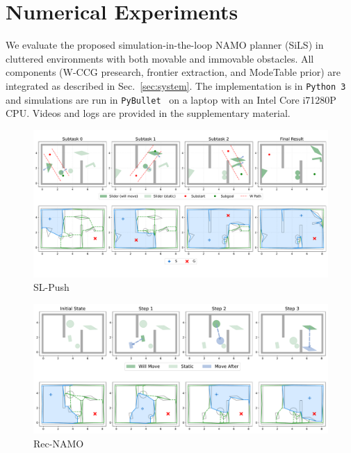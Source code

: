 \section{Numerical Experiments}
\label{sec:experiments}
We evaluate the proposed simulation-in-the-loop NAMO planner (SiLS)
in cluttered environments with both movable and immovable obstacles.
All components (W-CCG presearch, frontier extraction, and ModeTable prior)
are integrated as described in Sec.~\ref{sec:system}.
The implementation is in \texttt{Python~3} and simulations are run in
\texttt{PyBullet}~\cite{coumans2019} on a laptop with an Intel
Core i7\textendash1280P CPU. Videos and logs are provided in the
supplementary material.
\begin{figure}
  \centering
  \includegraphics[width=\columnwidth]{figures/straight.pdf}

\caption{SL-Push}
\end{figure}

\begin{figure}
  \centering
  \includegraphics[width=\columnwidth]{figures/Recursive.pdf}
\caption{Rec-NAMO}
\end{figure}




